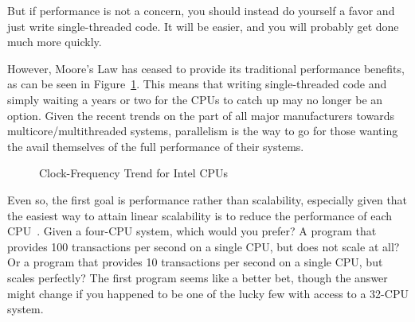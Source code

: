 But if performance is not a concern, you should instead do yourself
a favor and just write single-threaded code.
It will be easier, and you will probably get done much more quickly.

However, Moore's Law has ceased to provide its traditional performance
benefits, as can be seen in
Figure~\ref{fig:intro:Clock-Frequency Trend for Intel CPUs}.
This means that writing single-threaded code and simply waiting
a years or two for the CPUs to catch up may no longer be an option.
Given the recent trends on the part of all major manufacturers towards
multicore/multithreaded systems, parallelism is the way to go for
those wanting the avail themselves of the full performance of their
systems.

\begin{figure}[htb]
\begin{center}
\end{center}
\caption{Clock-Frequency Trend for Intel CPUs}
\label{fig:intro:Clock-Frequency Trend for Intel CPUs}
\end{figure}

Even so, the first goal is performance rather than scalability,
especially given that the easiest way to attain linear scalability
is to reduce the performance of each CPU~\cite{LinusTorvalds2001a}.
Given a four-CPU system, which would you prefer?
A program that provides 100 transactions per second on a single CPU,
but does not scale at all?
Or a program that provides 10 transactions per second on a single CPU,
but scales perfectly?
The first program seems like a better bet, though the answer might
change if you happened to be one of the lucky few with access to a
32-CPU system.

